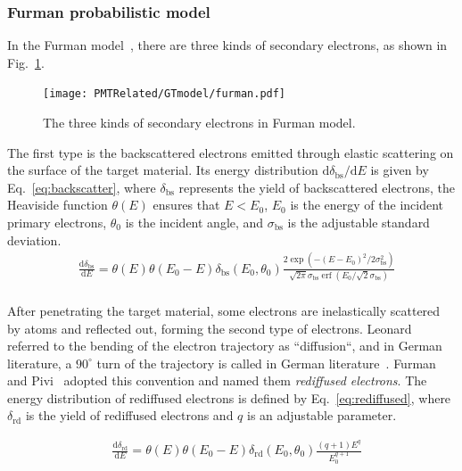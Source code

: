 \subsubsection{Furman probabilistic model}\label{subsec:fuman}
In the Furman model~\cite{2002Probabilistic}, there are three kinds of secondary electrons, as shown in Fig.~\ref{fig:furmanelectrons}.
\begin{figure}
	\centering
	\texttt{[image: PMTRelated/GTmodel/furman.pdf]}
	\caption{The three kinds of secondary electrons in Furman model.}
	\label{fig:furmanelectrons}
\end{figure}
The first type is the backscattered electrons emitted through elastic scattering on the surface of the target material. Its energy distribution $\mathrm{d}\delta_{\mathrm{bs}}/\mathrm{d}E$ is given by Eq.~\eqref{eq:backscatter}, where $\delta_{\mathrm{bs}}$ represents the yield of backscattered electrons, the Heaviside function $\theta(E)$ ensures that $E < E_0$, $E_0$ is the energy of the incident primary electrons, $\theta_0$ is the incident angle, and $\sigma_{\mathrm{bs}}$ is the adjustable standard deviation.
\begin{equation}
	\label{eq:backscatter}
	\begin{aligned}
		 & \frac{\mathrm{d}\delta_{\mathrm{bs}}}{\mathrm{d}E} =\theta(E) \theta\left(E_0-E\right) \delta_{\mathrm{bs}}\left(E_0, \theta_0\right)
		\frac{2 \exp \left(-\left(E-E_0\right)^2 / 2 \sigma_{\mathrm{bs}}^2\right)}{\sqrt{2 \pi} \sigma_{\mathrm{bs}}
		\operatorname{erf}\left(E_0 / \sqrt{2} \sigma_{\mathrm{bs}}\right)}                                                                      \\
	\end{aligned}
\end{equation}

After penetrating the target material, some electrons are inelastically scattered by atoms and reflected out, forming the second type of electrons. Leonard referred to the bending of the electron trajectory as ``diffusion``, and in German literature, a $90^\circ$ turn of the trajectory is called  in German literature~\cite{bruining_physics_1954}. Furman and Pivi~\cite{2002Probabilistic} adopted this convention and named them \emph{rediffused electrons}. The energy distribution of rediffused electrons is defined by Eq.~\eqref{eq:rediffused}, where $\delta_{\mathrm{rd}}$ is the yield of rediffused electrons and $q$ is an adjustable parameter.

\begin{equation}
	\label{eq:rediffused}
	\begin{aligned}
		 & \frac{\mathrm{d}\delta_{\mathrm{rd}}}{\mathrm{d}E} =\theta(E) \theta\left(E_0-E\right) \delta_{\mathrm{rd}}\left(E_0, \theta_0\right) \frac{(q+1) E^q}{E_0^{q+1}} \\
	\end{aligned}
\end{equation}


